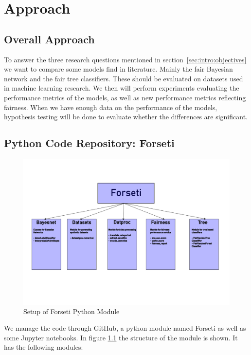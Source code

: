 \chapter{Approach}
\label{ch:approach}

\section{Overall Approach}
To answer the three research questions mentioned in section~\ref{sec:intro:objectives} we want to compare some models find in literature. Mainly the fair Bayesian network and the fair tree classifiers. These should be evaluated on datasets used in machine learning research. We then will perform experiments evaluating the performance metrics of the models, as well as new performance metrics reflecting fairness. When we have enough data on the performance of the models, hypothesis testing will be done to evaluate whether the differences are significant.

\section{Python Code Repository: Forseti}

\begin{figure}
    \centering
    \includegraphics[width=\linewidth]{figures/tegning.png}
    \caption{Setup of Forseti Python Module}
    \label{fig:forseti}
\end{figure}

We manage the code through GitHub, a python module named Forseti as well as some Jupyter notebooks. In figure \ref{fig:forseti} the structure of the module is shown. It has the following modules:

